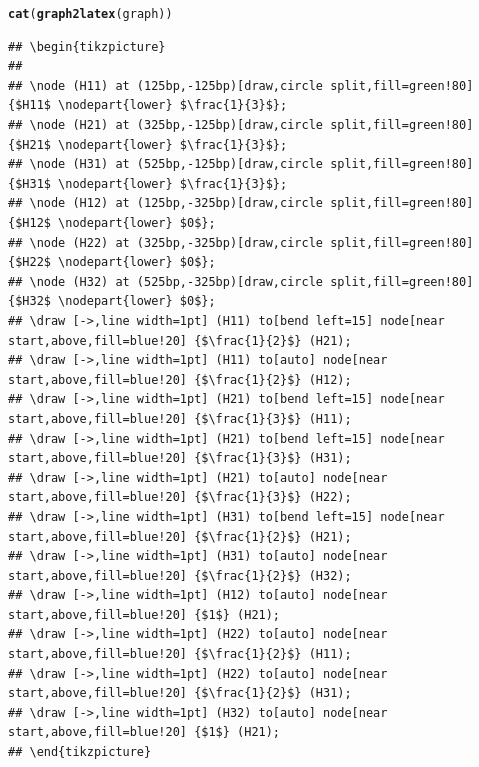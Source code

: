 \documentclass[a4paper, 10pt]{article}\usepackage[]{graphicx}\usepackage[]{color}
\makeatletter
\newcommand{\hlstd}[1]{\textcolor[rgb]{0.345,0.345,0.345}{#1}}%
\newcommand{\hlkwd}[1]{\textcolor[rgb]{0.737,0.353,0.396}{\textbf{#1}}}%
\newenvironment{kframe}{%
 \def\at@end@of@kframe{}%
 \ifinner\ifhmode%
  \def\at@end@of@kframe{\end{minipage}}%
  \begin{minipage}{\columnwidth}%
 \fi\fi%
 \def\FrameCommand##1{\hskip\@totalleftmargin \hskip-\fboxsep
 \colorbox{shadecolor}{##1}\hskip-\fboxsep
     \hskip-\linewidth \hskip-\@totalleftmargin \hskip\columnwidth}%
 \MakeFramed {\advance\hsize-\width
   \@totalleftmargin\z@ \linewidth\hsize
   \@setminipage}}%
 {\par\unskip\endMakeFramed%
 \at@end@of@kframe}
\newenvironment{knitrout}{}{} %
\numberwithin{equation}{section}
\theoremstyle{definition}
\theoremstyle{plain}
\makeatother
\begin{document}
\begin{knitrout}\footnotesize
{}\color{fgcolor}\begin{kframe}
\begin{alltt}
\hlkwd{cat}\hlstd{(}\hlkwd{graph2latex}\hlstd{(graph))}
\end{alltt}
\begin{verbatim}
## \begin{tikzpicture}
## 
## \node (H11) at (125bp,-125bp)[draw,circle split,fill=green!80] {$H11$ \nodepart{lower} $\frac{1}{3}$};
## \node (H21) at (325bp,-125bp)[draw,circle split,fill=green!80] {$H21$ \nodepart{lower} $\frac{1}{3}$};
## \node (H31) at (525bp,-125bp)[draw,circle split,fill=green!80] {$H31$ \nodepart{lower} $\frac{1}{3}$};
## \node (H12) at (125bp,-325bp)[draw,circle split,fill=green!80] {$H12$ \nodepart{lower} $0$};
## \node (H22) at (325bp,-325bp)[draw,circle split,fill=green!80] {$H22$ \nodepart{lower} $0$};
## \node (H32) at (525bp,-325bp)[draw,circle split,fill=green!80] {$H32$ \nodepart{lower} $0$};
## \draw [->,line width=1pt] (H11) to[bend left=15] node[near start,above,fill=blue!20] {$\frac{1}{2}$} (H21);
## \draw [->,line width=1pt] (H11) to[auto] node[near start,above,fill=blue!20] {$\frac{1}{2}$} (H12);
## \draw [->,line width=1pt] (H21) to[bend left=15] node[near start,above,fill=blue!20] {$\frac{1}{3}$} (H11);
## \draw [->,line width=1pt] (H21) to[bend left=15] node[near start,above,fill=blue!20] {$\frac{1}{3}$} (H31);
## \draw [->,line width=1pt] (H21) to[auto] node[near start,above,fill=blue!20] {$\frac{1}{3}$} (H22);
## \draw [->,line width=1pt] (H31) to[bend left=15] node[near start,above,fill=blue!20] {$\frac{1}{2}$} (H21);
## \draw [->,line width=1pt] (H31) to[auto] node[near start,above,fill=blue!20] {$\frac{1}{2}$} (H32);
## \draw [->,line width=1pt] (H12) to[auto] node[near start,above,fill=blue!20] {$1$} (H21);
## \draw [->,line width=1pt] (H22) to[auto] node[near start,above,fill=blue!20] {$\frac{1}{2}$} (H11);
## \draw [->,line width=1pt] (H22) to[auto] node[near start,above,fill=blue!20] {$\frac{1}{2}$} (H31);
## \draw [->,line width=1pt] (H32) to[auto] node[near start,above,fill=blue!20] {$1$} (H21);
## \end{tikzpicture}
\end{verbatim}
\end{kframe}
\end{knitrout}

\end{document}

